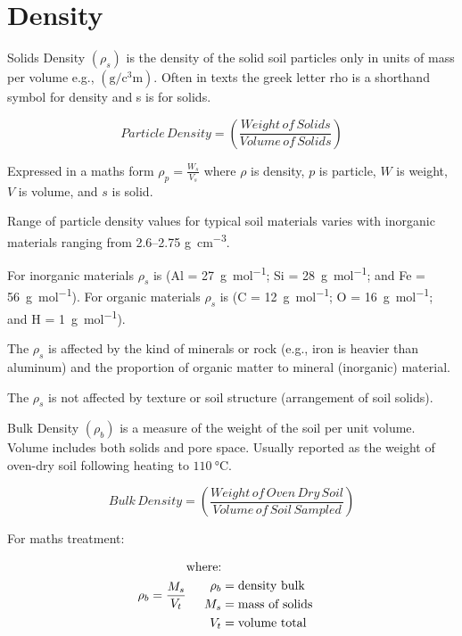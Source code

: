 \documentclass[a5paper]{report}
\begin{document}
\section{Density}
\label{density}
    
Solids Density $\left(\rho_s\right)$ is the density of the solid soil particles only in units of mass per volume e.g., $\left(\unit{\gram\per\cubic\centi\metre}\right)$. Often in texts the greek letter rho  is a shorthand symbol for density and s is for solids.

\begin{equation}
    Particle\,Density = \left(\frac{Weight\,of\,Solids}{Volume\,of\,Solids}\right)   
\end{equation}

Expressed in a maths form $\rho_p =\frac{W_s}{V_s}$ where $\rho$ is density, $p$ is particle, $W$ is weight, $V$ is volume, and $s$ is solid.

Range of particle density values for typical soil materials varies with inorganic materials ranging from \numrange{2.6}{2.75} \unit{\gram\per\cubic\centi\metre}.

For inorganic materials $\rho_s$ is  (Al = \qty[per-mode = symbol]{27}{\gram\per\mole}; Si =  \qty[per-mode = symbol]{28}{\gram\per\mole}; and Fe = \qty[per-mode = symbol]{56}{\gram\per\mole}). For organic materials $\rho_s$ is  (C = \qty[per-mode = symbol]{12}{\gram\per\mole}; O = \qty[per-mode = symbol]{16}{\gram\per\mole}; and H = \qty[per-mode = symbol]{1}{\gram\per\mole}).

The $\rho_s$ is affected by the kind of minerals or rock (e.g., iron is heavier than aluminum) and the proportion of organic matter to mineral (inorganic) material.

The $\rho_s$ is not affected by texture or soil structure (arrangement of soil solids).

Bulk Density $\left(\rho_b\right)$ is a measure of the weight of the soil per unit volume. Volume includes both solids and pore space. Usually reported as the weight of oven-dry soil following heating to $\SI{110}{\degreeCelsius}$.

\begin{equation}
    Bulk\,Density = \left(\frac{Weight\,of\,Oven\,Dry\,Soil}{Volume\,of\,Soil\,Sampled}\right)
\end{equation}

For maths treatment:

\begin{equation}
    \rho_b = \frac{M_s}{V_t}\quad\\
    \begin{aligned}
    \text{where:}\\
        \rho_b &= \text{density bulk} \\
        M_s &= \text{mass of solids} \\
        V_t &= \text{volume total} \\
    \end{aligned}
\end{equation}
\end{document}
